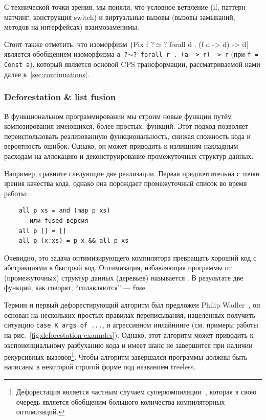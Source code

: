 С технической точки зрения, мы поняли, что условное ветвление (if, паттерн-матчинг, конструкция switch) и виртуальные вызовы (вызовы замыканий, методов на интерфейсах) взаимозаменимы.

Стоит также отметить, что изоморфизм \texttt|Fix f ?$\simeq$? forall d . (f d -> d) -> d| является обобщением изоморфизма \texttt{a ?$\sim$? forall r . (a -> r) -> r} (при \texttt{f = Const a}), который является основой CPS трансформации, рассматриваемой нами далее в~\ref{sec:continuations}.

\subsubsection{Deforestation \& list fusion} \label{subsubsec:deforestation-fusion}

В функциональном программировании мы строим новые функции путём композирования имеющихся, более простых, функций.
Этот подход позволяет переиспользовать реализованную функциональность, снижая сложность кода и вероятность ошибок.
Однако, он может приводить к излишним накладным расходам на аллокацию и деконструирование промежуточных структур данных.

Например, сравните следующие две реализации.
Первая предпочтительна с точки зрения качества кода, однако она порождает промежуточный список во время работы:
\begin{verbatim}
    all p xs = and (map p xs)
    -- или fused версия
    all p [] = []
    all p (x:xs) = p x && all p xs
\end{verbatim}

Очевидно, это задача оптимизирующего компилятора превращать хороший код с абстракциями в быстрый код.
Оптимизация, избавляющая программы от (промежуточных) структур данных (деревьев) называется .
В результате две функции, как говорят, ``сплавляются'' --- fuse.

Термин и первый дефорестирующий алгоритм был предложен Philip Wadler~\cite{wadler1988deforestation}, он основан на нескольких простых правилах переписывания, нацеленных получить ситуацию \texttt{case K args of ...}, и агрессивном инлайнинге (см. примеры работы на рис.~\ref{fig:deforestation-examples}).
Однако, этот алгоритм может приводить к экспоненциальному разбуханию кода и имеет шанс не завершится при наличии рекурсивных вызовов\footnote{Дефорестация является частным случаем суперкомпиляции~\cite{supercomp}, которая в свою очередь является обобщеним большого количества компиляторных оптимизаций.}.
Чтобы алгоритм завершался программы должны быть написаны в некоторой строгой форме под названием treeless.

